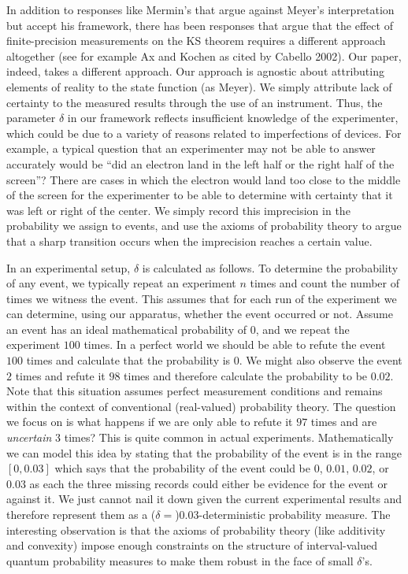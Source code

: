\documentclass[english,reprint, aps, prl,superscriptaddress, showpacs,
showkeys, longbibliography, amsmath, amssymb, floatfix]{revtex4-1}
\theoremstyle{plain}
\theoremstyle{definition}
\begin{document}
In addition to responses like Mermin's that argue against Meyer's
interpretation but accept his framework, there has been responses that
argue that the effect of finite-precision measurements on the KS
theorem requires a different approach altogether (see for example Ax
and Kochen as cited by Cabello 2002). Our paper, indeed, takes a
different approach. Our approach is agnostic about attributing
elements of reality to the state function (as Meyer). We simply
attribute lack of certainty to the measured results through the use of
an instrument. Thus, the parameter $\delta$ in our framework reflects
insufficient knowledge of the experimenter, which could be due to a
variety of reasons related to imperfections of devices. For example, a
typical question that an experimenter may not be able to answer
accurately would be ``did an electron land in the left half or the
right half of the screen''? There are cases in which the electron
would land too close to the middle of the screen for the experimenter
to be able to determine with certainty that it was left or right of
the center. We simply record this imprecision in the probability we
assign to events, and use the axioms of probability theory to argue
that a sharp transition occurs when the imprecision reaches a certain
value.

In an experimental setup, $\delta$ is calculated as follows. To
determine the probability of any event, we typically repeat an
experiment $n$ times and count the number of times we witness the
event. This assumes that for each run of the experiment we can
determine, using our apparatus, whether the event occurred or
not. Assume an event has an ideal mathematical probability of $0$, and
we repeat the experiment $100$ times. In a perfect world we should be
able to refute the event $100$ times and calculate that the
probability is $0$. We might also observe the event $2$ times and
refute it $98$ times and therefore calculate the probability to be
$0.02$. Note that this situation assumes perfect measurement
conditions and remains within the context of conventional
(real-valued) probability theory. The question we focus on is what
happens if we are only able to refute it $97$ times and are
\emph{uncertain} $3$ times? This is quite common in actual
experiments. Mathematically we can model this idea by stating that the
probability of the event is in the range $\left[0,0.03\right]$ which
says that the probability of the event could be $0$, $0.01$, $0.02$,
or $0.03$ as each the three missing records could either be evidence
for the event or against it. We just cannot nail it down given the
current experimental results and therefore represent them as a
($\delta=$)$0.03$-deterministic probability measure. The interesting
observation is that the axioms of probability theory (like additivity
and convexity) impose enough constraints on the structure of
interval-valued quantum probability measures to make them robust in
the face of small $\delta$'s.
\end{document}
